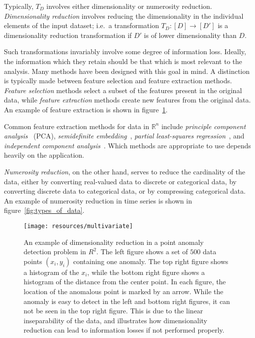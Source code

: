 Typically, $T_D$ involves either dimensionality or numerosity reduction. \emph{Dimensionality reduction} involves reducing the dimensionality in the individual elements of the input dataset; i.e.\ a transformation $T_D: [D] \rightarrow [D']$ is a dimensionality reduction transformation if $D'$ is of lower dimensionality than $D$.

Such transformations invariably involve some degree of information loss. Ideally, the information which they retain should be that which is most relevant to the analysis. Many methods have been designed with this goal in mind. A distinction is typically made between feature selection and feature extraction methods. \emph{Feature selection} methods select a subset of the features present in the original data, while \emph{feature extraction} methods create new features from the original data. An example of feature extraction is shown in figure~\ref{fig:dimensionality_reduction}.

Common feature extraction methods for data in $\mathbb{R}^n$ include \emph{principle component analysis}~\cite{TODO} (PCA), \emph{semidefinite embedding}~\cite{TODO}, \emph{partial least-squares regression}~\cite{TODO}, and \emph{independent component analysis}~\cite{TODO}. Which methods are appropriate to use depends heavily on the application.

\emph{Numerosity reduction}, on the other hand, serves to reduce the cardinality of the data, either by converting real-valued data to discrete or categorical data, by converting discrete data to categorical data, or by compressing categorical data. An example of numerosity reduction in time series is shown in figure~\ref{fig:types_of_data}.

\begin{figure}[htb]
\begin{center}
\leavevmode
\texttt{[image: resources/multivariate]}
\end{center}
\caption{\small{An example of dimensionality reduction in a point anomaly detection problem in $R^2$. The left figure shows a set of $500$ data points $(x_i, y_i)$ containing one anomaly. The top right figure shows a histogram of the $x_i$, while the bottom right figure shows a histogram of the distance from the center point. In each figure, the location of the anomalous point is marked by an arrow. While the anomaly is easy to detect in the left and bottom right figures, it can not be seen in the top right figure. This is due to the linear inseparability of the data, and illustrates how dimensionality reduction can lead to information losses if not performed properly.}}
\label{fig:dimensionality_reduction}
\end{figure}

